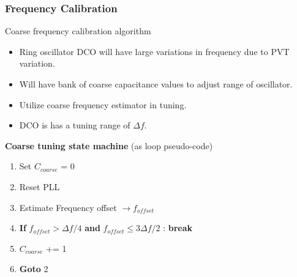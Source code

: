 \documentclass[t, screen, aspectratio=43]{beamer}
\begin{document}
\begin{frame}
	\frametitle{Frequency Calibration}
	\begin{block}{Coarse frequency calibration algorithm}
		\begin{itemize}
			\scriptsize
			\item Ring oscillator DCO will have large variations in frequency due to PVT variation.
			\item Will have bank of coarse capacitance values to adjust range of oscillator.
			\item Utilize coarse frequency estimator in tuning.
			\item DCO is has a tuning range of $\Delta f$.

		\end{itemize} 	
		\scriptsize
		\textbf{Coarse tuning state machine} (as loop pseudo-code)
			\begin{enumerate}
				\scriptsize
				\item Set $C_{coarse}$ = 0
				\item Reset PLL
				\item Estimate Frequency offset $\rightarrow f_{offset}$
				\item \textbf{If} $f_{offset} > \Delta f/4$ \textbf{and} $f_{offset} \leq 3\Delta f/2$ : \textbf{break}
				\item $C_{coarse}$ += 1
				\item \textbf{Goto} 2
			\end{enumerate}
 
	\end{block}
\end{frame}



\end{document}
